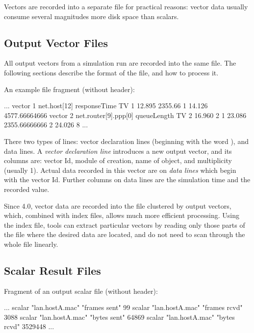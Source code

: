 
Vectors are recorded into a separate file for practical reasons: vector
data usually consume several magnitudes more disk space than scalars.

\subsection{Output Vector Files}

All output vectors from a simulation run are recorded into the same file.
The following sections describe the format of the file, and
how to process it.

An example file fragment (without header):

\begin{filelisting}
...
vector 1   net.host[12]  responseTime  TV
1  12.895  2355.66
1  14.126  4577.66664666
vector 2   net.router[9].ppp[0] queueLength  TV
2  16.960  2
1  23.086  2355.66666666
2  24.026  8
...
\end{filelisting}

There two types of lines: vector declaration lines (beginning with the word
), and data lines. A \textit{vector declaration line}
introduces a new output vector, and its columns are: vector Id, module of
creation, name of  object, and multiplicity (usually 1).
Actual data recorded in this vector are on \textit{data lines} which begin
with the vector Id. Further columns on data lines are the simulation time
and the recorded value.


Since {\opp} 4.0, vector data are recorded into the file clustered by
output vectors, which, combined with index files, allows much more
efficient processing. Using the index file, tools can extract particular
vectors by reading only those parts of the file where the desired data are
located, and do not need to scan through the whole file linearly.


\subsection{Scalar Result Files}

Fragment of an output scalar file (without header):

\begin{filelisting}
...
scalar "lan.hostA.mac" "frames sent"  99
scalar "lan.hostA.mac" "frames rcvd"  3088
scalar "lan.hostA.mac" "bytes sent"   64869
scalar "lan.hostA.mac" "bytes rcvd"   3529448
...
\end{filelisting}

